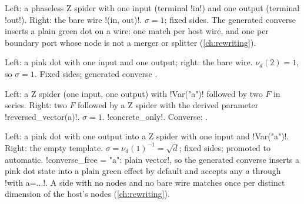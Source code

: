 Left: a phaseless Z spider with one input (terminal \code!in!) and one output (terminal
\code!out!). Right: the bare wire \code!(in, out)!. $\sigma=1$; fixed sides. The generated
converse  inserts a plain green dot on a wire: one match per host wire,
and one per boundary port whose node is not a merger or splitter (\cref{ch:rewriting}).

Left: a pink dot with one input and one output; right: the bare wire. $\nu_d(2)=1$, so
$\sigma=1$. Fixed sides; generated converse .

Left: a Z spider (one input, one output) with \py!Var("a")! followed by two $F$ in series. Right:
two $F$ followed by a Z spider with the derived parameter \py!reversed_vector(a)!. $\sigma=1$.
\py!concrete_only!. Converse: .

Left: a pink dot with one output into a Z spider with one input and \py!Var("a")!. Right: the
empty template. $\sigma=\nu_d(1)^{-1}=\sqrt d$; fixed sides; promoted to automatic.
\py!converse_free = {"a": plain vector}!, so the generated converse 
inserts a pink dot state into a plain green effect by default and accepts any $a$ through
\azx!with a=...!. A side with no nodes and no bare wire matches once per distinct dimension of
the host's nodes (\cref{ch:rewriting}).

